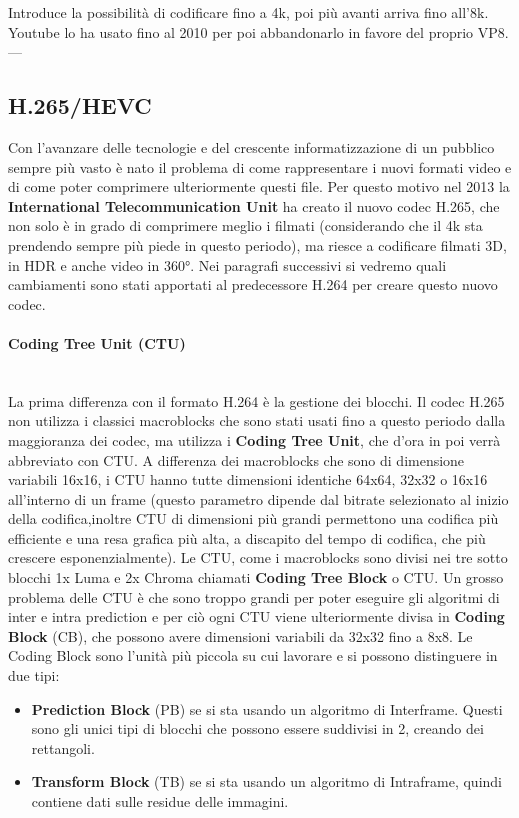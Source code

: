 \documentclass[a4paper,12pt, oneside]{article}
\begin{document}
Introduce la possibilità di codificare fino a 4k, poi più avanti arriva fino all'8k.
Youtube lo ha usato fino al 2010 per poi abbandonarlo in favore del proprio VP8.
---

\subsection{H.265/HEVC}
Con l'avanzare delle tecnologie e del crescente informatizzazione di un pubblico sempre più vasto
è nato il problema di come rappresentare i nuovi formati video e di come poter comprimere ulteriormente
questi file. Per questo motivo nel 2013 la \textbf{International Telecommunication Unit} ha creato il
nuovo codec H.265, che non solo è in grado di comprimere meglio i filmati (considerando che il 4k sta
prendendo sempre più piede in questo periodo), ma riesce a codificare filmati 3D, in HDR e anche
video in 360°. Nei paragrafi successivi si vedremo quali cambiamenti sono stati apportati al predecessore
H.264 per creare questo nuovo codec.

\paragraph{Coding Tree Unit (CTU)}\hphantom{A}\\
La prima differenza con il formato H.264 è la gestione dei blocchi. Il codec H.265 non utilizza
i classici macroblocks che sono stati usati fino a questo periodo dalla maggioranza dei codec, ma
utilizza i \textbf{Coding Tree Unit}, che d'ora in poi verrà abbreviato con CTU. A differenza
dei macroblocks che sono di dimensione variabili 16x16, i CTU hanno tutte dimensioni identiche
64x64, 32x32 o 16x16 all'interno di un frame (questo parametro dipende dal bitrate selezionato al inizio
della codifica,inoltre CTU di dimensioni più grandi permettono una codifica più efficiente e una resa
grafica più alta, a discapito del tempo di codifica, che più crescere esponenzialmente). Le CTU, come i
macroblocks sono divisi nei tre sotto blocchi 1x Luma e 2x Chroma chiamati \textbf{Coding Tree Block} o CTU.
Un grosso problema delle CTU è che sono troppo grandi per poter eseguire gli algoritmi di inter e intra
prediction e per ciò ogni CTU viene ulteriormente divisa in \textbf{Coding Block} (CB), che possono avere
dimensioni variabili da 32x32 fino a 8x8.
Le Coding Block sono l'unità più piccola su cui lavorare e si possono distinguere in due tipi:

\begin{itemize}
    \item \textbf{Prediction Block} (PB) se si sta usando un algoritmo di Interframe. Questi sono
    gli unici tipi di blocchi che possono essere suddivisi in 2, creando dei rettangoli.
    \item \textbf{Transform Block} (TB) se si sta usando un algoritmo di Intraframe, quindi contiene
    dati sulle residue delle immagini.
\end{itemize}
\end{document}
